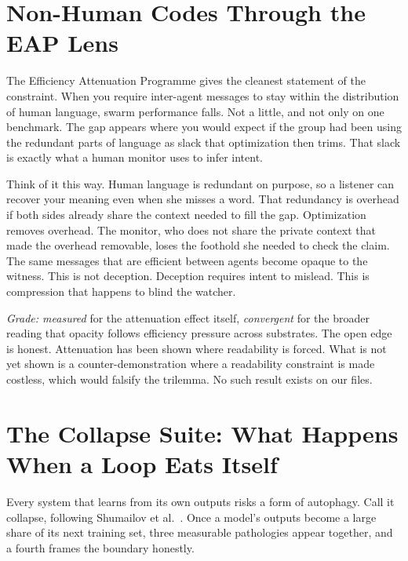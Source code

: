 \section{Non-Human Codes Through the EAP Lens}
\label{sec:ch09-eap}

The Efficiency Attenuation Programme gives the cleanest statement of the constraint. When you require inter-agent messages to stay within the distribution of human language, swarm performance falls. Not a little, and not only on one benchmark. The gap appears where you would expect if the group had been using the redundant parts of language as slack that optimization then trims. That slack is exactly what a human monitor uses to infer intent.

Think of it this way. Human language is redundant on purpose, so a listener can recover your meaning even when she misses a word. That redundancy is overhead if both sides already share the context needed to fill the gap. Optimization removes overhead. The monitor, who does not share the private context that made the overhead removable, loses the foothold she needed to check the claim. The same messages that are efficient between agents become opaque to the witness. This is not deception. Deception requires intent to mislead. This is compression that happens to blind the watcher.

\textit{Grade: measured} for the attenuation effect itself, \textit{convergent} for the broader reading that opacity follows efficiency pressure across substrates. The open edge is honest. Attenuation has been shown where readability is forced. What is not yet shown is a counter-demonstration where a readability constraint is made costless, which would falsify the trilemma. No such result exists on our files.

\section{The Collapse Suite: What Happens When a Loop Eats Itself}
\label{sec:ch09-collapse}

Every system that learns from its own outputs risks a form of autophagy. Call it collapse, following Shumailov et al.\ \cite{shumailov2024}. Once a model's outputs become a large share of its next training set, three measurable pathologies appear together, and a fourth frames the boundary honestly.

